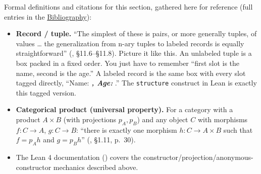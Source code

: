 Formal definitions and citations for this section, gathered here for reference (full entries in the \hyperref[sec:root:bibliography:1]{Bibliography}):

\begin{itemize}
\tightlist
\item
  \textbf{Record / tuple.} ``The simplest of these is pairs, or more generally tuples, of values \ldots{} the generalization from n-ary tuples to labeled records is equally straightforward'' (\cite{Pierce2002}, §11.6--§11.8). Picture it like this. An unlabeled tuple is a box packed in a fixed order. You just have to remember ``first slot is the name, second is the age.'' A labeled record is the same box with every slot tagged directly, ``Name: \textbf{\emph{, Age: }}.'' The \texttt{structure} construct in Lean is exactly this tagged version.
\item
  \textbf{Categorical product (universal property).} For a category with a product \(A \times B\) (with projections \(p_A, p_B\)) and any object \(C\) with morphisms \(f : C \to A\), \(g : C \to B\): ``there is exactly one morphism \(h : C \to A \times B\) such that \(f = p_A h\) and \(g = p_B h\)'' (\cite{Pareigis1970}, §1.11, p.~30).
\item
  The Lean 4 documentation (\cite{LeanDocs}) covers the constructor/projection/anonymous-constructor mechanics described above.
\end{itemize}
